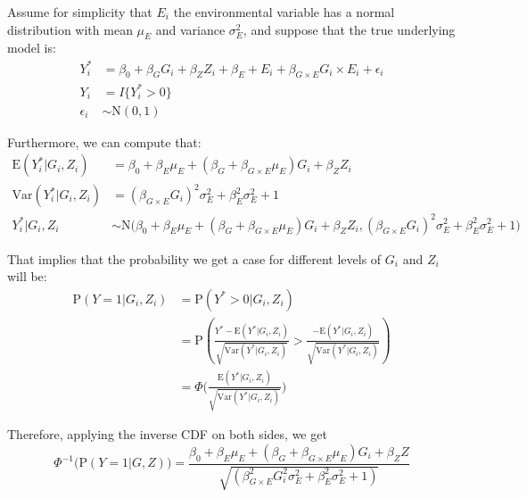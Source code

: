 \documentclass[
]{article}
\begin{document}
Assume for simplicity that \(E_i\) the environmental variable has a
normal distribution with mean \(\mu_E\) and variance \(\sigma_E^2\), and
suppose that the true underlying model is:
\begin{equation}\label{eqn:probitModelWithInteraction}
\begin{aligned}
Y_i^* &= \beta_0 + \beta_G G_i + \beta_Z Z_i + \beta_E + E_i + \beta_{G\times E} G_i \times E_i + \epsilon_i \\
Y_i &= I\{Y_i^*>0\} \\
\epsilon_i &\sim \text{N}(0,1)
\end{aligned}
\end{equation}

Furthermore, we can compute that:
\begin{equation}\label{eqn:probitModelWithInteraction_MeanVar}
\begin{aligned}
\text{E}(Y_i^*|G_i,Z_i) &= \beta_0 + \beta_E \mu_E + (\beta_G + \beta_{G\times E} \mu_E)G_i + \beta_Z Z_i \\
\text{Var}(Y_i^*|G_i,Z_i) &= (\beta_{G\times E} G_i)^2 \sigma_E^2 + \beta_E^2 \sigma_E^2 + 1 \\
Y_i^*|G_i, Z_i &\sim \text{N}\bigg(\beta_0 + \beta_E \mu_E + (\beta_G + \beta_{G\times E} \mu_E)G_i + \beta_Z Z_i, (\beta_{G\times E} G_i)^2 \sigma_E^2 + \beta_E^2 \sigma_E^2 + 1 \bigg)
\end{aligned}
\end{equation}

That implies that the probability we get a case for different levels of
\(G_i\) and \(Z_i\) will be:
\begin{equation}\label{eqn:probitModelWithInteraction_Prob} 
\begin{aligned} 
\text{P}(Y = 1 | G_i, Z_i) &= \text{P}(Y^* > 0| G_i, Z_i) \\ 
                           &= \text{P}(\frac{Y^*  - \text{E}(Y^* |G_i,Z_i)}{\sqrt{\text{Var}(Y^* |G_i,Z_i)}} > \frac{-\text{E}(Y^* |G_i,Z_i)}{\sqrt{\text{Var}(Y^* |G_i,Z_i)}}) \\
                           &= \Phi \bigg( \frac{\text{E}(Y^* |G_i,Z_i)}{\sqrt{\text{Var}(Y^* |G_i,Z_i)}} \bigg)
\end{aligned}
\end{equation}

Therefore, applying the inverse CDF on both sides, we get
\[\Phi^{-1} \bigg(\text{P}(Y = 1 | G, Z) \bigg) = \frac{\beta_0+\beta_E \mu_E+(\beta_G + \beta_{G\times E} \mu_E)G_i + \beta_Z Z}{\sqrt{(\beta_{G\times E}^2 G_i^2 \sigma_E^2 + \beta_E^2 \sigma_E^2 + 1)}} \]
\end{document}
